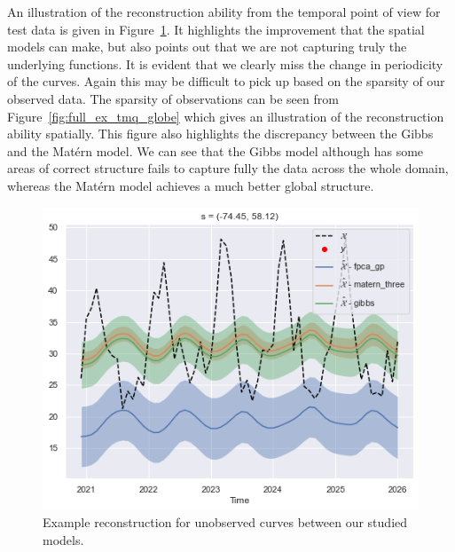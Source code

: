 An illustration of the reconstruction ability from the temporal point of view for test data is given in Figure~\ref{fig:test_ex_tmq_globe}.
It highlights the improvement that the spatial models can make, but also points out that we are not capturing truly the underlying functions.
It is evident that we clearly miss the change in periodicity of the curves.
Again this may be difficult to pick up based on the sparsity of our observed data.
The sparsity of observations can be seen from Figure~\ref{fig:full_ex_tmq_globe} which gives an illustration of the reconstruction ability spatially.
This figure also highlights the discrepancy between the Gibbs and the Mat\'ern model.
We can see that the Gibbs model although has some areas of correct structure fails to capture fully the data across the whole domain, whereas the Mat\'ern model achieves a much better global structure.

\begin{figure}
	\centering
	\includegraphics[width=\textwidth]{test_ex_tmq_globe}
	\caption{Example reconstruction for unobserved curves between our studied models.}
	\label{fig:test_ex_tmq_globe}
\end{figure}

